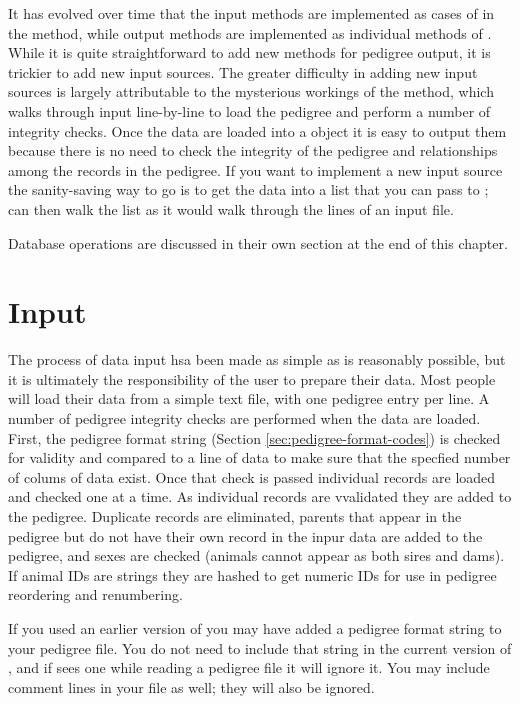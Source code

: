 It has evolved over time that the input methods are implemented as cases of  in the  method, while output methods are implemented as individual methods of . While it is quite straightforward to add new methods for pedigree output, it is trickier to add new input sources. The greater difficulty in adding new input sources is largely attributable to the mysterious workings of the  method, which walks through input line-by-line to load the pedigree and perform a number of integrity checks. Once the data are loaded into a  object it is easy to output them because there is no need to check the integrity of the pedigree and relationships among the records in the pedigree. If you want to implement a new input source the sanity-saving way to go is to get the data into a list that you can pass to ;  can then walk the list as it would walk through the lines of an input file.

Database operations are discussed in their own section at the end of this chapter.

\section{Input}\label{sec:io-input}
The process of data input hsa been made as simple as is reasonably possible, but it is ultimately the responsibility of the user to prepare their data. Most people will load their data from a simple text file, with one pedigree entry per line. A number of pedigree integrity checks are performed when the data are loaded. First, the pedigree format string (Section \ref{sec:pedigree-format-codes}) is checked for validity and compared to a line of data to make sure that the specfied number of colums of data exist. Once that check is passed individual records are loaded and checked one at a time. As individual records are vvalidated they are added to the pedigree. Duplicate records are eliminated, parents that appear in the pedigree but do not have their own record in the inpur data are added to the pedigree, and sexes are checked (animals cannot appear as both sires and dams). If animal IDs are strings they are hashed to get numeric IDs for use in pedigree reordering and renumbering.

If you used an earlier version of \PyPedal{} you may have added a pedigree format string to your pedigree file. You do not need to include that string in the current version of \PyPedal{}, and if  sees one while reading a pedigree file it will ignore it. You may include comment lines in your file as well; they will also be ignored.

